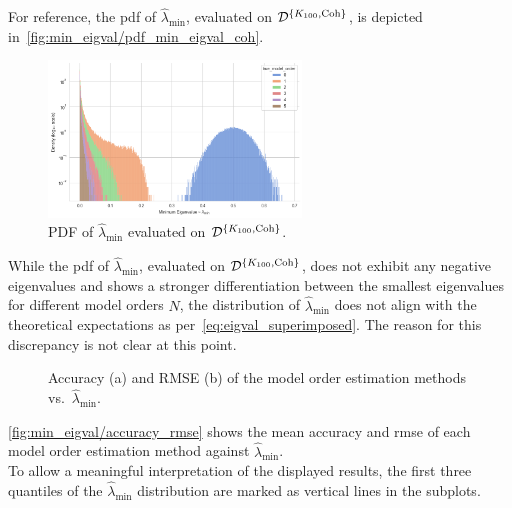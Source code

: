 For reference, the \gls{pdf} of \( \widehat{\lambda}_{\min} \), evaluated on \( \mathcal{D}^{\{K_{100},\text{Coh}\}} \), is depicted in~\autoref{fig:min_eigval/pdf_min_eigval_coh}.
\begin{figure}[H]
    \centering
    \includegraphics[width=0.6\textwidth]{figures/07_Evaluation/min_eigval/neg_eigvasls_distrib_coherent.png}
    \caption{PDF of \( \widehat{\lambda}_{\min} \) evaluated on \( \mathcal{D}^{\{K_{100},\text{Coh}\}} \).}
    \label{fig:min_eigval/pdf_min_eigval_coh}
\end{figure}
While the \gls{pdf} of \( \widehat{\lambda}_{\min} \), evaluated on \( \mathcal{D}^{\{K_{100},\text{Coh}\}} \), does not exhibit any negative eigenvalues
and shows a stronger differentiation between the smallest eigenvalues for different model orders \( N \), the distribution
of \( \widehat{\lambda}_{\min} \) does not align with the theoretical expectations as per~\autoref{eq:eigval_superimposed}.
The reason for this discrepancy is not clear at this point.

\begin{figure}[H]
    \centering
    \caption{Accuracy (a) and RMSE (b) of the model order estimation methods vs.\ \( \widehat{\lambda}_{\min} \).}
    \label{fig:min_eigval/accuracy_rmse}
\end{figure}
\autoref{fig:min_eigval/accuracy_rmse} shows the mean accuracy and \gls{rmse} of each model order estimation method
against \( \widehat{\lambda}_{\min} \). \\
To allow a meaningful interpretation of the displayed results, the first three quantiles of the \( \widehat{\lambda}_{\min} \)
distribution are marked as vertical lines in the subplots. \\

